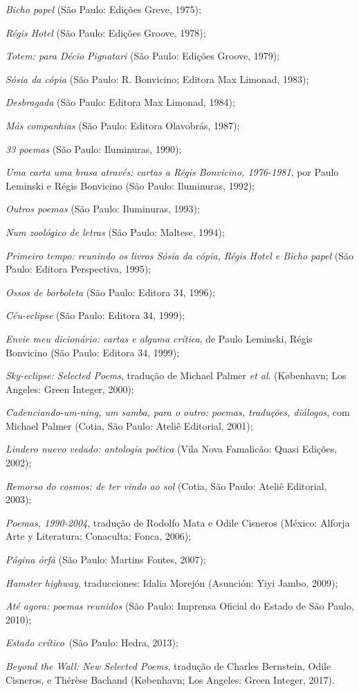 \begin{Parskip}
\emph{Bicho papel} (São Paulo: Edições Greve, 1975);

\emph{Régis Hotel} (São Paulo: Edições Groove, 1978);

\emph{Totem: para Décio Pignatari} (São Paulo: Edições Groove, 1979);

\emph{Sósia da cópia} (São Paulo: R. Bonvicino; Editora Max Limonad, 1983);

\emph{Desbragada} (São Paulo: Editora Max Limonad, 1984);

\emph{Más companhias} (São Paulo: Editora Olavobrás, 1987);

\emph{33 poemas} (São Paulo: Iluminuras, 1990);

\emph{Uma carta uma brasa através: cartas a Régis Bonvicino, 1976-1981},
por Paulo Leminski e Régis Bonvicino (São Paulo: Iluminuras, 1992);

\emph{Outros poemas} (São Paulo: Iluminuras, 1993);

\emph{Num zoológico de letras} (São Paulo: Maltese, 1994);

\emph{Primeiro tempo: reunindo os livros Sósia da cópia, Régis Hotel e
Bicho papel} (São Paulo: Editora Perspectiva, 1995);

\emph{Ossos de borboleta} (São Paulo: Editora 34, 1996);

\emph{Céu-eclipse} (São Paulo: Editora 34, 1999);

\emph{Envie meu dicionário: cartas e alguma crítica}, de Paulo Leminski,
Régis Bonvicino (São Paulo: Editora 34, 1999);

\emph{Sky-eclipse: Selected Poems}, tradução de Michael Palmer \emph{et
al}. (København; Los Angeles: Green Integer, 2000);

\emph{Cadenciando-um-ning, um samba, para o outro: poemas, traduções,
diálogos}, com Michael Palmer (Cotia, São Paulo: Ateliê Editorial, 2001);

\emph{Lindero nuevo vedado: antologia poética} (Vila Nova Famalicão:
Quasi Edições, 2002);

\emph{Remorso do cosmos: de ter vindo ao sol} (Cotia, São Paulo: Ateliê
Editorial, 2003);

\emph{Poemas, 1990-2004}, tradução de Rodolfo Mata e Odile
Cisneros (México: Alforja Arte y Literatura; Conaculta; Fonca, 2006);

\emph{Página órfã} (São Paulo: Martins Fontes, 2007);

\emph{Hamster highway}, traducciones: Idalia Morejón (Asunción: Yiyi Jambo, 2009);

\emph{Até agora: poemas reunidos} (São Paulo: Imprensa Oficial do Estado de São Paulo, 2010);

\emph{Estado crítico}~(São Paulo: Hedra, 2013);

\emph{Beyond the Wall: New Selected Poems}, tradução de Charles
Bernstein, Odile Cisneros, e Thérèse Bachand (København; Los Angeles:
Green Integer, 2017).
\end{Parskip}

